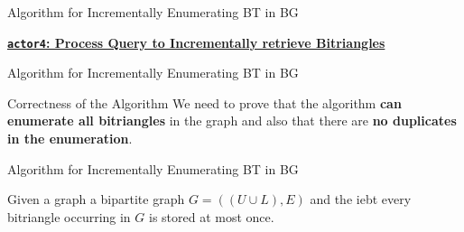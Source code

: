 \begin{frame}[fragile]{Algorithm for Incrementally Enumerating BT in BG}
  \begin{center}
    \underline{\color{red}\textbf{\texttt{actor4}: Process Query to Incrementally retrieve Bitriangles}}
  \end{center}
  \begin{center}
\end{center}
\end{frame}


\begin{frame}[fragile]{Algorithm for Incrementally Enumerating BT in BG}
  \begin{block}{Correctness of the Algorithm}
    We need to prove that the algorithm \textbf{can enumerate all bitriangles} in the graph and also that there are \textbf{no duplicates in the enumeration}.
  \end{block}
\end{frame}


\begin{frame}[fragile]{Algorithm for Incrementally Enumerating BT in BG}
  \begin{theorem} 
    Given a graph a bipartite graph $G = ((U\cup L),E)$ and the \acrshort{iebt} every bitriangle occurring in $G$ is stored at most once.
  \end{theorem}
\end{frame} 

